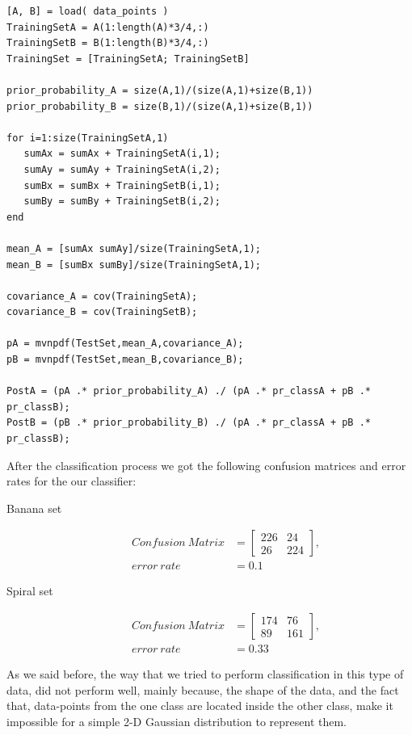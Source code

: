 \documentclass[a4paper,11pt]{article}
\begin{document}
\begin{verbatim}
[A, B] = load( data_points )
TrainingSetA = A(1:length(A)*3/4,:)
TrainingSetB = B(1:length(B)*3/4,:)
TrainingSet = [TrainingSetA; TrainingSetB]

prior_probability_A = size(A,1)/(size(A,1)+size(B,1))
prior_probability_B = size(B,1)/(size(A,1)+size(B,1))

for i=1:size(TrainingSetA,1)
   sumAx = sumAx + TrainingSetA(i,1);
   sumAy = sumAy + TrainingSetA(i,2);
   sumBx = sumBx + TrainingSetB(i,1);
   sumBy = sumBy + TrainingSetB(i,2);
end

mean_A = [sumAx sumAy]/size(TrainingSetA,1);
mean_B = [sumBx sumBy]/size(TrainingSetA,1);

covariance_A = cov(TrainingSetA);
covariance_B = cov(TrainingSetB);

pA = mvnpdf(TestSet,mean_A,covariance_A);
pB = mvnpdf(TestSet,mean_B,covariance_B);

PostA = (pA .* prior_probability_A) ./ (pA .* pr_classA + pB .* pr_classB);
PostB = (pB .* prior_probability_B) ./ (pA .* pr_classA + pB .* pr_classB);
\end{verbatim} 
After the classification process we got the following confusion matrices and error rates for the our classifier:
\begin{description}
\item[Banana set]
\begin{align*}
Confusion\ Matrix &= 
\begin{bmatrix}
226 & 24 \\ 
26 & 224
\end{bmatrix},\\
error\ rate &= 0.1
\end{align*}
\item[Spiral set]
\begin{align*}
Confusion\ Matrix &= 
\begin{bmatrix}
174 & 76 \\ 
89 & 161
\end{bmatrix},\\
error\ rate &= 0.33
\end{align*}
\end{description}
As we said before, the way that we tried to perform classification in this type of data, did not perform well, mainly because, the shape of the data, and the fact that, data-points from the one class are located inside the other class, make it impossible for a simple 2-D Gaussian distribution to represent them.
\end{document}
